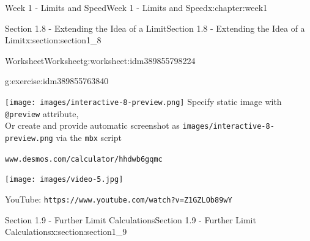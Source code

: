 \documentclass[oneside,10pt,]{book}
\newcommand{\mono}[1]{\texttt{#1}}
\numberwithin{equation}{section}
\newlength{\qrsize}
\newlength{\previewwidth}
\begin{document}
\begin{chapterptx}{Week 1 - Limits and Speed}{}{Week 1 - Limits and Speed}{}{}{x:chapter:week1}
\begin{sectionptx}{Section 1.8 - Extending the Idea of a Limit}{}{Section 1.8 - Extending the Idea of a Limit}{}{}{x:section:section1_8}
\begin{worksheet-subsection}{Worksheet}{}{Worksheet}{}{}{g:worksheet:idm389855798224}
\begin{divisionexercise}{2}{}{}{g:exercise:idm389855763840}
\setlength{\qrsize}{9em}
\setlength{\previewwidth}{\linewidth}
\addtolength{\previewwidth}{-\qrsize}
\begin{tcbraster}[raster columns=2, raster column skip=1pt, raster halign=center, raster force size=false, raster left skip=0pt, raster right skip=0pt]%
\begin{tcolorbox}[previewstyle, width=\previewwidth]%
%
{\texttt{[image: images/interactive-8-preview.png]}}%
{\small{}Specify static image with \mono{@preview} attribute,\\Or create and provide automatic screenshot as \mono{images/interactive-8-preview.png} via the \mono{mbx} script}%
\end{tcolorbox}%
\begin{tcolorbox}[qrstyle]%
{\hypersetup{urlcolor=black}}%
\end{tcolorbox}%
\begin{tcolorbox}[captionstyle]%
\small \mono{www.desmos.com/calculator/hhdwb6gqmc}\end{tcolorbox}%
\end{tcbraster}%
%
\end{divisionexercise}%
\end{worksheet-subsection}
\restoregeometry
\setlength{\qrsize}{9em}
\setlength{\previewwidth}{\linewidth}
\addtolength{\previewwidth}{-\qrsize}
\begin{tcbraster}[raster columns=2, raster column skip=1pt, raster halign=center, raster force size=false, raster left skip=0pt, raster right skip=0pt]%
\begin{tcolorbox}[previewstyle, width=\previewwidth]%
\texttt{[image: images/video-5.jpg]}%
\end{tcolorbox}%
\begin{tcolorbox}[qrstyle]%
{\hypersetup{urlcolor=black}}%
\end{tcolorbox}%
\begin{tcolorbox}[captionstyle]%
\small YouTube: \mono{https://www.youtube.com/watch?v=Z1GZLOb89wY}\end{tcolorbox}%
\end{tcbraster}%
\end{sectionptx}
%
%
\typeout{************************************************}
\typeout{************************************************}
%
\begin{sectionptx}{Section 1.9 - Further Limit Calculations}{}{Section 1.9 - Further Limit Calculations}{}{}{x:section:section1_9}

\end{sectionptx}
\end{chapterptx}
\end{document}
